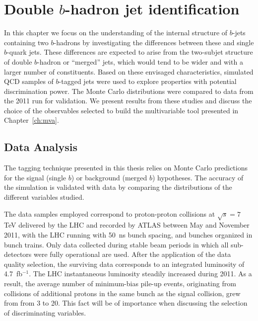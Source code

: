\chapter{Double $b$-hadron jet identification}\label{ch:kinematic}

In this chapter we focus on the understanding of the internal structure of $b$-jets containing two $b$-hadrons by investigating the differences between these and single $b$-quark jets.  These differences %
are expected to arise from the two-subjet structure of double $b$-hadron or ``merged'' jets, which would tend to be wider and with a larger number of constituents. 
Based on these envisaged characteristics, simulated QCD samples of $b$-tagged jets were used to explore properties with potential discrimination power.  The Monte Carlo distributions were  compared to data from the 2011 run for validation.
We present results from these studies and discuss the choice of the observables selected to build the multivariable tool presented in Chapter~\ref{ch:mva}.


\section{Data Analysis}\label{sec:analysis}


The tagging technique presented in this thesis relies on Monte Carlo predictions for the signal (single $b$) or background (merged $b$) hypotheses. The accuracy of the simulation is validated with data by comparing the distributions of the different variables studied.

The data samples employed correspond to proton-proton collisions at $\sqrt{s}=7$ TeV delivered by the LHC and recorded by ATLAS between May and November 2011, with the LHC running with 50~ns bunch spacing, and bunches organized in bunch trains. Only data collected during stable beam periods in which all sub-detectors were fully operational are used. After the application of the data quality selection, the  surviving data corresponds to an integrated luminosity of 4.7~fb$^{-1}$. The LHC instantaneous luminosity steadily increased during 2011. As a result, the average number of minimum-bias pile-up events, originating from collisions of additional protons in the same bunch as the signal collision, grew from from 3 to 20. This fact will be of importance when discussing the selection of discriminating variables.  

